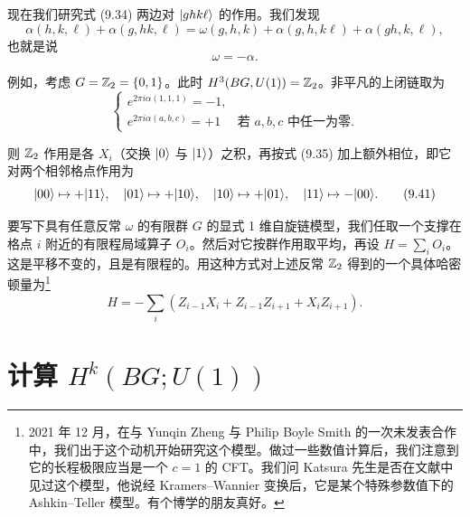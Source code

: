 现在我们研究式 (9.34) 两边对 $|ghk\ell\rangle$ 的作用。我们发现
\begin{equation}
  \alpha(h,k,\ell)+\alpha(g,hk,\ell)
  =\omega(g,h,k)+\alpha(g,h,k\ell)+\alpha(gh,k,\ell),
  \tag{9.38}
\end{equation}
也就是说
\begin{equation}
  \omega=-\alpha.
  \tag{9.39}
\end{equation}

例如，考虑 $G=\mathbb{Z}_2=\{0,1\}$。此时 $H^3(BG,U(1))=\mathbb{Z}_2$。非平凡的上闭链取为
\begin{equation}
  \begin{cases}
    e^{2\pi i\alpha(1,1,1)}=-1,\\
    e^{2\pi i\alpha(a,b,c)}=+1 & \text{若 } a,b,c \text{ 中任一为零}.
  \end{cases}
  \tag{9.40}
\end{equation}

则 $\mathbb{Z}_2$ 作用是各 $X_i$（交换 $|0\rangle$ 与 $|1\rangle$）之积，再按式 (9.35) 加上额外相位，即它对两个相邻格点作用为
\begin{equation}
  |00\rangle\mapsto+|11\rangle,\quad
  |01\rangle\mapsto+|10\rangle,\quad
  |10\rangle\mapsto+|01\rangle,\quad
  |11\rangle\mapsto-|00\rangle.
  \tag{9.41}
\end{equation}

要写下具有任意反常 $\omega$ 的有限群 $G$ 的显式 1 维自旋链模型，我们任取一个支撑在格点 $i$ 附近的有限程局域算子 $O_i$。然后对它按群作用取平均，再设 $H=\sum_iO_i$。这是平移不变的，且是有限程的。用这种方式对上述反常 $\mathbb{Z}_2$ 得到的一个具体哈密顿量为\footnote{2021 年 12 月，在与 Yunqin Zheng 与 Philip Boyle Smith 的一次未发表合作中，我们出于这个动机开始研究这个模型。做过一些数值计算后，我们注意到它的长程极限应当是一个 $c=1$ 的 CFT。我们问 Katsura 先生是否在文献中见过这个模型，他说经 Kramers--Wannier 变换后，它是某个特殊参数值下的 Ashkin--Teller 模型。有个博学的朋友真好。}
\begin{equation}
  H=-\sum_i(Z_{i-1}X_i+Z_{i-1}Z_{i+1}+X_iZ_{i+1}).
  \tag{9.42}
\end{equation}


\section{计算 $H^k(BG;U(1))$}

